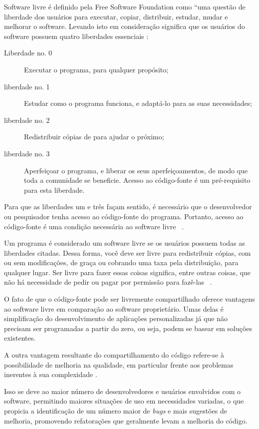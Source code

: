 Software livre é definido pela Free Software Foundation como “uma questão de liberdade dos usuários para executar, copiar, distribuir, estudar, mudar e melhorar o software. Levando isto em consideração significa que os usuários do software possuem quatro liberdades essenciais \cite{stallman2002free}:

\begin{description}
\item[Liberdade no. 0] Executar o programa, para qualquer propósito;
\item[liberdade no. 1] Estudar como o programa funciona, e adaptá-lo para as suas necessidades;
\item[liberdade no. 2] Redistribuir cópias de para ajudar o próximo;
\item[liberdade no. 3] Aperfeiçoar o programa, e liberar os seus aperfeiçoamentos, de modo que toda a comunidade se beneficie. Acesso ao código-fonte é um pré-requisito para esta liberdade.
\end{description}

Para que as liberdades um e três façam sentido, é necessário que o desenvolvedor ou pesquisador tenha acesso ao código-fonte do programa.  Portanto, acesso ao código-fonte é uma condição necessária ao software livre ~\cite{gnu2013}.

Um programa é considerado um software livre se os usuários possuem todas as liberdades citadas. Dessa forma, você deve ser livre para redistribuir cópias, com ou sem modificações, de graça ou cobrando uma taxa pela distribuição, para qualquer lugar. Ser livre para fazer essas coisas significa, entre outras coisas, que não há necessidade de pedir ou pagar por permissão para fazê-las ~\cite{anaPaula2012}.

O fato de que o código-fonte pode ser livremente compartilhado oferece vantagens ao software livre em comparação ao software proprietário. Umas delas é simplificação do desenvolvimento de aplicações personalizadas já que não precisam ser programadas a partir do zero, ou seja, podem se basear em soluções existentes.

A outra vantagem resultante do compartilhamento do código refere-se à possibilidade de melhoria na qualidade, em particular frente aos problemas inerentes à sua complexidade \cite{catedralBazzar}.

Isso se deve ao maior número de desenvolvedores e usuários envolvidos com o software, permitindo maiores situações de uso em necessidades variadas, o que propicia a identificação de um número maior de \emph{bugs} e mais sugestões de melhoria, promovendo refatorações que geralmente levam a melhoria do código.

